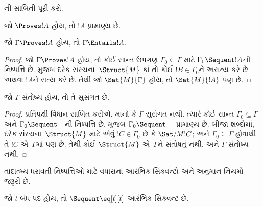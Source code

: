 \begin{prob}
ની સાબિતી પૂરી કરો.
\end{prob}




\begin{cor}
જો $\Proves !A$ હોય, તો $!A$ પ્રામાણ્ય છે.
\end{cor}

\begin{cor}
જો $\Gamma \Proves !A$ હોય, તો $\Gamma \Entails !A$.
\end{cor}

\begin{proof}
જો $\Gamma \Proves !A$ હોય, તો કોઈ સાન્ત ઉપગણ
$\Gamma_0 \subseteq \Gamma$ માટે $\Gamma_0 \Sequent !A$ની
નિષ્પત્તિ છે.  મુજબ દરેક
સંરચના~$\Struct{M}$
કાં તો કોઈ $!B \in \Gamma_0$ને અસત્ય કરે છે અથવા $!A$ને સત્ય કરે છે.
તેથી જો $\Sat{M}{\Gamma}$ હોય, તો
$\Sat{M}{!A}$ પણ છે.
\end{proof}

\begin{cor}
જો $\Gamma$ સંતોષ્ય હોય, તો તે સુસંગત છે.
\end{cor}

\begin{proof}
પ્રતિપક્ષી વિધાન સાબિત કરીએ. માનો કે $\Gamma$ સુસંગત નથી. ત્યારે કોઈ
સાન્ત $\Gamma_0 \subseteq \Gamma$ અને
$\Gamma_0 \Sequent \quad$ની નિષ્પત્તિ છે.
 મુજબ $\Gamma_0 \Sequent \quad$ પ્રામાણ્ય
છે. બીજા શબ્દોમાં, દરેક
સંરચના~$\Struct{M}$
માટે એવું $!C \in \Gamma_0$ છે કે
$\Sat/{M}{!C}$; અને
$\Gamma_0 \subseteq \Gamma$ હોવાથી તે $!C$ એ~$\Gamma$માં પણ છે. તેથી
કોઈ $\Struct{M}$ એ~$\Gamma$ને સંતોષતું નથી,
અને $\Gamma$ સંતોષ્ય નથી.
\end{proof}
\endgroup


%
  \begingroup
\makeatletter{}\makeatother


\label{guunit:OLP-0082}


તાદાત્મ્ય ધરાવતી નિષ્પત્તિઓ માટે વધારાનાં આરંભિક સિક્વન્ટો અને
અનુમાન-નિયમો જરૂરી છે.

\begin{defn}[$\eq$ માટેનાં આરંભિક સિક્વન્ટો]
જો $t$ બંધ પદ હોય, તો ${} \Sequent \eq[t][t]$ આરંભિક સિક્વન્ટ છે.
\end{defn}

